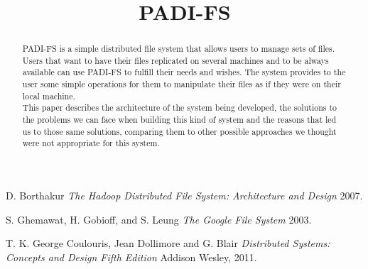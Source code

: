 \documentclass[times, 10pt,twocolumn]{article}
\begin{document}
\title{PADI-FS}

\maketitle
\thispagestyle{empty}

\begin{abstract}
   PADI-FS is a simple distributed file system that allows users to manage
   sets of files. Users that want to have their files replicated on several
   machines and to be always available can use PADI-FS to fulfill their
   needs and wishes. The system provides to the user some simple operations
   for them to manipulate their files as if they were on their local machine.\\

   This paper describes the architecture of the system being developed, the
   solutions to the problems we can face when building this kind of system
   and the reasons that led us to those same solutions, comparing them to
   other possible approaches we thought were not appropriate for this system.
\end{abstract}













\begin{thebibliography}{1}

   D. Borthakur {\em The Hadoop Distributed File System: Architecture and Design}  2007.

    S. Ghemawat, H. Gobioff, and S. Leung {\em The Google File System} 2003.

   T. K. George Coulouris, Jean Dollimore and G. Blair {\em Distributed Systems: Concepts and Design Fifth Edition} Addison Wesley, 2011.

\end{thebibliography}
\end{document}
